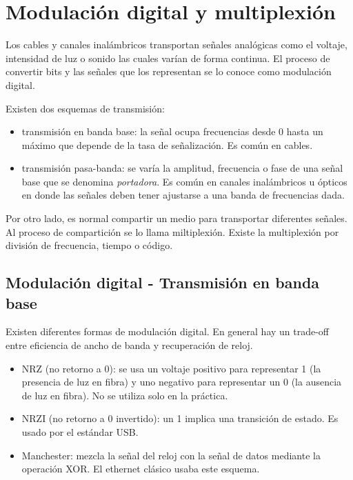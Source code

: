 \documentclass{book}
\begin{document}
	\section{Modulación digital y multiplexión}
	Los cables y canales inalámbricos transportan señales analógicas como el voltaje, intensidad de luz o sonido las cuales varían de forma continua. El proceso de convertir bits y las señales que los representan se lo conoce como modulación digital.
	
	\vspace{3mm}
	Existen dos esquemas de transmisión:
	
	\begin{itemize}
		\item transmisión en banda base: la señal ocupa frecuencias desde 0 hasta un máximo que depende de la tasa de señalización. Es común en cables.
		\item transmisión pasa-banda: se varía la amplitud, frecuencia o fase de una señal base que se denomina \textit{portadora}. Es común en canales inalámbricos u ópticos en donde las señales deben tener ajustarse a una banda de frecuencias dada.
	\end{itemize}
	
	Por otro lado, es normal compartir un medio para transportar diferentes señales. Al proceso de compartición se lo llama miltiplexión. Existe la multiplexión por división de frecuencia, tiempo o código.
	
	\subsection{Modulación digital - Transmisión en banda base}
	Existen diferentes formas de modulación digital. En general hay un trade-off entre eficiencia de ancho de banda y recuperación de reloj.
	
	\begin{itemize}
		\item NRZ (no retorno a 0): se usa un voltaje positivo para representar 1 (la presencia de luz en fibra) y uno negativo para representar un 0 (la ausencia de luz en fibra). No se utiliza solo en la práctica.
		\item NRZI (no retorno a 0 invertido): un 1 implica una transición de estado. Es usado por el estándar USB.
		\item Manchester: mezcla la señal del reloj con la señal de datos mediante la operación XOR. El ethernet clásico usaba este esquema.
	\end{itemize}
	
\end{document}
